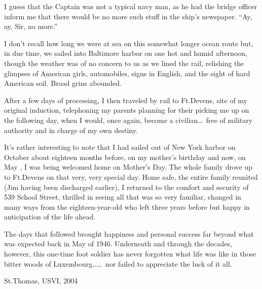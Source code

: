 \documentclass[../m3y]{subfiles}
\begin{document}
I guess that the Captain was not a typical navy man, as he had the bridge officer inform me that there would be no more such stuff in the ship's newspaper. ``Ay, ay, Sir, no more.''

I don't recall how long we were at sea on this somewhat longer ocean route but, in due time, we sailed into Baltimore harbor on one hot and humid afternoon, though the weather was of no concern to us as we lined the rail, relishing the glimpses of American girls, automobiles, signs in English, and the sight of hard American soil. Broad grins abounded.

After a few days of processing, I then traveled by rail to Ft.\@ Devens, site of my original induction, telephoning my parents planning for their picking me up on the following day, when I would, once again, become a civilian\ldots\ free of military authority and in charge of my own destiny.

It's rather interesting to note that I had sailed out of New York harbor on October  about eighteen months before, on my mother's birthday and now, on May , I was being welcomed home on Mother's Day. The whole family drove up to Ft.\@ Devens on that very, very special day. Home safe, the entire family reunited (Jim having been discharged earlier), I returned to the comfort and security of 539 School Street, thrilled in seeing all that was so very familiar, changed in many ways from the eighteen-year-old who left three years before but happy in anticipation of the life ahead.

The days that followed brought happiness and personal success far beyond what was expected back in May of 1946. Underneath and through the decades, however, this one-time foot soldier has never forgotten what life was like in those bitter woods of Luxembourg\ldots\ldots\ nor failed to appreciate the luck of it all.

\begin{flushright}St.\@ Thomas, USVI, 2004\end{flushright}
\end{document}
